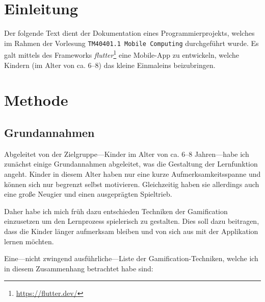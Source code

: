 
\section{Einleitung}\label{sec:introduction}

Der folgende Text dient der Dokumentation eines Programmierprojekts, welches im Rahmen der Vorlesung \texttt{TM40401.1 Mobile Computing} durchgeführt wurde.
Es galt mittels des Frameworks \emph{flutter}\footnote{\url{https://flutter.dev/}} eine Mobile-App zu entwickeln, welche Kindern (im Alter von ca. 6--8) das kleine Einmaleins beizubringen.



\section{Methode}

\subsection{Grundannahmen}

Abgeleitet von der Zielgruppe---Kinder im Alter von ca. 6--8 Jahren---habe ich zunächst einige Grundannahmen abgeleitet, was die Gestaltung der Lernfunktion angeht.
Kinder in diesem Alter haben nur eine kurze Aufmerksamkeitsspanne und können sich nur begrenzt selbst motivieren. Gleichzeitig haben sie allerdings auch eine große Neugier und einen ausgeprägten Spieltrieb.

Daher habe ich mich früh dazu entschieden Techniken der Gamification einzusetzen um den Lernprozess spielerisch zu gestalten.
Dies soll dazu beitragen, dass die Kinder länger aufmerksam bleiben und von sich aus mit der Applikation lernen möchten.

Eine---nicht zwingend ausführliche---Liste der Gamification-Techniken, welche ich in diesem Zusammenhang betrachtet habe sind:

